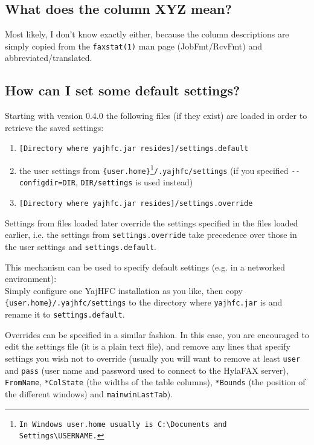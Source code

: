 \documentclass[a4paper,10pt]{scrartcl}
\begin{document}
\subsection{What does the column XYZ mean?}

Most likely, I don't know exactly either, because the column descriptions
are simply copied from the \verb.faxstat(1). man page (JobFmt/RcvFmt) and 
abbreviated/translated.

\subsection{How can I set some default settings?}

Starting with version 0.4.0 the following files (if they exist) are loaded in order to retrieve the saved settings:
\begin{enumerate}
 \item \texttt{[Directory where yajhfc.jar resides]/settings.default}
 \item the user settings from \texttt{\{user.home\}\footnote{In Windows \texttt{user.home} usually is \texttt{C:\textbackslash Documents and Settings\textbackslash USERNAME}.}/.yajhfc/settings} (if you specified \texttt{-{-}configdir=DIR}, \texttt{DIR/settings} is used instead)
 \item \texttt{[Directory where yajhfc.jar resides]/settings.override}
\end{enumerate}

Settings from files loaded later override the settings specified in the files loaded earlier, i.e. the settings from \texttt{settings.override} take precedence over those in the user settings and \texttt{settings.default}.
\medskip

This mechanism can be used to specify default settings (e.g. in a networked environment): \\
Simply configure one YajHFC installation as you like, then copy \texttt{\{user.home\}/.yajhfc/settings} to the directory where \texttt{yajhfc.jar} is and rename it to \texttt{settings.default}.
\medskip

Overrides can be specified in a similar fashion. In this case, you are encouraged to edit the settings file (it is a plain text file), and remove any lines that specify settings you wish not to override (usually you will want to remove at least \texttt{user} and \texttt{pass} (user name and password used to connect to the HylaFAX server), \texttt{FromName}, \texttt{*ColState} (the widths of the table columns), \texttt{*Bounds} (the position of the different windows) and \texttt{mainwinLastTab}).
\end{document}
